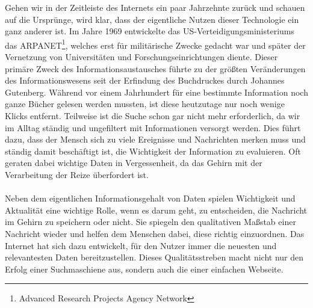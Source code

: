 Gehen wir in der Zeitleiste des Internets ein paar Jahrzehnte zurück und schauen auf die Ursprünge, wird klar, dass der eigentliche Nutzen dieser Technologie ein ganz anderer ist. Im Jahre 1969 entwickelte das US-Verteidigungsministeriums das ARPANET\footnote{Advanced Research Projects Agency Network}, welches erst für militärische Zwecke gedacht war und später der Vernetzung von Universitäten und Forschungseinrichtungen diente. Dieser primäre Zweck des Informationsaustausches führte zu der größten Veränderungen des Informationswesens seit der Erfindung des Buchdruckes durch Johannes Gutenberg. Während vor einem Jahrhundert für eine bestimmte Information noch ganze Bücher gelesen werden mussten, ist diese heutzutage nur noch wenige \glqq Klicks\grqq{} entfernt. Teilweise ist die Suche schon gar nicht mehr erforderlich, da wir im Alltag ständig und ungefiltert mit Informationen versorgt werden. Dies führt dazu, dass der Mensch sich zu viele Ereignisse und Nachrichten merken muss und ständig damit beschäftigt ist, die Wichtigkeit der Information zu evaluieren. Oft geraten dabei wichtige Daten in Vergessenheit, da das Gehirn mit der Verarbeitung der Reize überfordert ist.\\
\\
Neben dem eigentlichen Informationsgehalt von Daten spielen Wichtigkeit und Aktualität eine wichtige Rolle, wenn es darum geht, zu entscheiden, die Nachricht im Gehirn zu speichern oder nicht. Sie spiegeln den qualitativen Maßstab einer Nachricht wieder und helfen dem Menschen dabei, diese richtig einzuordnen. Das Internet hat sich dazu entwickelt, für den Nutzer immer die neuesten und relevantesten Daten bereitzustellen. Dieses Qualitätsstreben macht nicht nur den Erfolg einer Suchmaschiene aus, sondern auch die einer einfachen Webseite.



